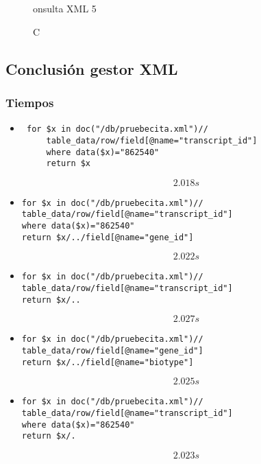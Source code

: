 \documentclass[12pt,a4paper]{article}
\begin{document}
\begin{figure}[!h]
\centering
{}
\caption Consulta XML 5
\label{xml5}
\end{figure}



\newpage



\subsection{Conclusión gestor XML}  \label{pto43}

\subsubsection{Tiempos}  \label{pto431}

\begin{itemize}
\item 
\begin{verbatim}
 for $x in doc("/db/pruebecita.xml")//
     table_data/row/field[@name="transcript_id"]
     where data($x)="862540"
     return $x
\end{verbatim}

$$2.018s$$

\item 
\begin{verbatim}
for $x in doc("/db/pruebecita.xml")//
table_data/row/field[@name="transcript_id"]
where data($x)="862540"
return $x/../field[@name="gene_id"]
\end{verbatim}

$$2.022s$$

\item 
\begin{verbatim}
for $x in doc("/db/pruebecita.xml")//
table_data/row/field[@name="transcript_id"]
return $x/..
\end{verbatim}

$$2.027s$$

\item 
\begin{verbatim}
for $x in doc("/db/pruebecita.xml")//
table_data/row/field[@name="gene_id"]
return $x/../field[@name="biotype"]
\end{verbatim}

$$2.025s$$

\item 
\begin{verbatim}
for $x in doc("/db/pruebecita.xml")//
table_data/row/field[@name="transcript_id"]
where data($x)="862540"
return $x/.
\end{verbatim}

$$2.023s$$


\end{itemize}
\end{document}

